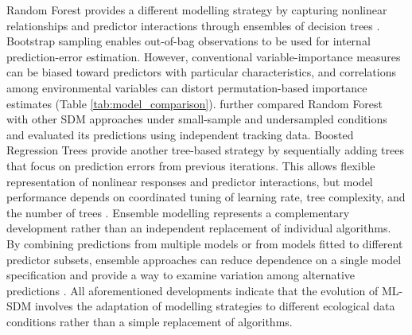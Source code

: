 \documentclass[authoryear,preprint,review,12pt]{elsarticle}
\begin{document}
Random Forest provides a different modelling strategy by capturing nonlinear relationships and predictor interactions through ensembles of decision trees \citep{cutler2007random}. Bootstrap sampling enables out-of-bag observations to be used for internal prediction-error estimation. However, conventional variable-importance measures can be biased toward predictors with particular characteristics, and correlations among environmental variables can distort permutation-based importance estimates (Table \ref{tab:model_comparison}). \cite{mi2017choose} further compared Random Forest with other SDM approaches under small-sample and undersampled conditions and evaluated its predictions using independent tracking data. Boosted Regression Trees provide another tree-based strategy by sequentially adding trees that focus on prediction errors from previous iterations. This allows flexible representation of nonlinear responses and predictor interactions, but model performance depends on coordinated tuning of learning rate, tree complexity, and the number of trees \citep{elith2008working}. Ensemble modelling represents a complementary development rather than an independent replacement of individual algorithms. By combining predictions from multiple models or from models fitted to different predictor subsets, ensemble approaches can reduce dependence on a single model specification and provide a way to examine variation among alternative predictions \citep{araujo2007ensemble,breiner2015overcoming}. All aforementioned developments indicate that the evolution of ML-SDM involves the adaptation of modelling strategies to different ecological data conditions rather than a simple replacement of algorithms.
\end{document}
